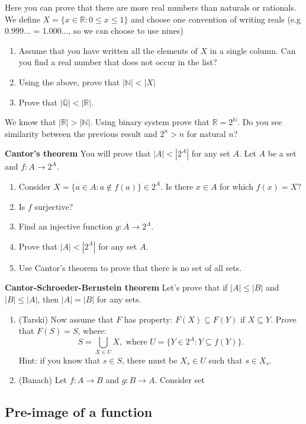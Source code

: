 \begin{prob}
	Here you can prove that there are more real numbers than naturals or rationals. We define $X=\{x\in \mathbb R : 0\le x\le 1\}$ and choose one
	 convention of writing reals (e.g 0.999... = 1.000..., so we can choose to use nines)   
	\begin{enumerate}
		\item Assume that you have written all the elements of $X$ in a single column. Can you find a real number that does not occur in the list? 
		\item Using the above, prove that $|\mathbb N| < |X|$
		\item Prove that $|\mathbb Q| < |\mathbb R|.$
	\end{enumerate}
\end{prob}

\begin{prob}
	We know that $|\mathbb R| > |\mathbb N|.$ Using binary system prove that $\mathbb R=2^\mathbb N.$ Do you see similarity between the previous result
	and $2^n > n$ for natural $n$?
\end{prob}

\begin{prob}
	\textbf{Cantor's theorem} You will prove that $|A|<\left|2^A\right|$ for any set $A$. Let $A$ be a set and $f:A\to 2^A.$
	\begin{enumerate}
		\item Consider $X=\{a\in A : a\notin f(a)\}\in 2^A$. Is there $x\in A$ for which $f(x)=X?$
		\item Is $f$ surjective? 
		\item Find an injective function $g: A\to 2^A.$
		\item Prove that $|A| < |2^A|$ for any set $A$.
		\item Use Cantor's theorem to prove that there is no set of all sets.
	\end{enumerate}
\end{prob}


\begin{prob}
	\textbf{Cantor-Schroeder-Bernstein theorem} Let's prove that if $|A|\le|B|$ and $|B|\le |A|$, then $|A|=|B|$ for any sets.
	\begin{enumerate}
		\item (Tarski) Now assume that $F$ has property: $F(X)\subseteq F(Y)$ if $X\subseteq Y$. Prove that $F(S)=S$, where:
			$$S=\bigcup_{X\in U} X, \text{~where~} U= \{Y\in 2^A : Y\subseteq f(Y)\}.$$
			Hint: if you know that $s\in S$, there must be $X_s\in U$ such that $s\in X_s.$
		\item (Banach) Let $f: A\to B$ and $g:B\to A$. Consider set
	\end{enumerate}
\end{prob}

\subsection{Pre-image of a function}

